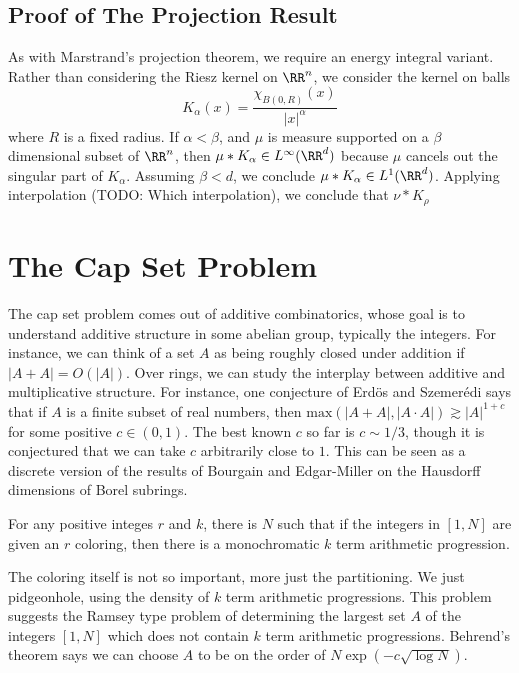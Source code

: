 \section{Proof of The Projection Result}

As with Marstrand's projection theorem, we require an energy integral variant. Rather than considering the Riesz kernel on $\RR^n$, we consider the kernel on balls
%
\[ K_\alpha(x) = \frac{\chi_{B(0,R)}(x)}{|x|^\alpha} \]
%
where $R$ is a fixed radius. If $\alpha < \beta$, and $\mu$ is measure supported on a $\beta$ dimensional subset of $\RR^n$, then $\mu * K_\alpha \in L^\infty(\RR^d)$ because $\mu$ cancels out the singular part of $K_\alpha$. Assuming $\beta < d$, we conclude $\mu * K_\alpha \in L^1(\RR^d)$. Applying interpolation (TODO: Which interpolation), we conclude that $\nu * K_\rho$ 

\chapter{The Cap Set Problem}

The cap set problem comes out of additive combinatorics, whose goal is to understand additive structure in some abelian group, typically the integers. For instance, we can think of a set $A$  as being roughly closed under addition if $|A+A| = O(|A|)$. Over rings, we can study the interplay between additive and multiplicative structure. For instance, one conjecture of Erd\"{o}s and Szemer\'{e}di says that if $A$ is a finite subset of real numbers, then $\text{max}(|A+A|,|A \cdot A|) \gtrsim |A|^{1+c}$ for some positive $c \in (0,1)$. The best known $c$ so far is $c \sim 1/3$, though it is conjectured that we can take $c$ arbitrarily close to $1$. This can be seen as a discrete version of the results of Bourgain and Edgar-Miller on the Hausdorff dimensions of Borel subrings.

\begin{theorem}
	For any positive integes $r$ and $k$, there is $N$ such that if the integers in $[1,N]$ are given an $r$ coloring, then there is a monochromatic $k$ term arithmetic progression.
\end{theorem}

The coloring itself is not so important, more just the partitioning. We just pidgeonhole, using the density of $k$ term arithmetic progressions. This problem suggests the Ramsey type problem of determining the largest set $A$ of the integers $[1,N]$ which does not contain $k$ term arithmetic progressions. Behrend's theorem says we can choose $A$ to be on the order of $N\exp(-c \sqrt{\log N})$.

